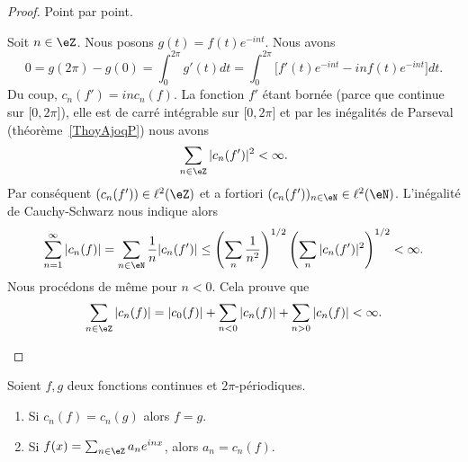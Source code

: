 \begin{proof}
	Point par point.
	\begin{subproof}
		Soit \( n\in \eZ\). Nous posons \( g(t)=f(t) e^{-int}\). Nous avons
		\begin{equation}
			0=g(2\pi)-g(0)=\int_0^{2\pi}g'(t)dt=\int_0^{2\pi}\big[ f'(t) e^{-int}-inf(t) e^{-int} \big]dt.
		\end{equation}
		Du coup, \( c_n(f')=inc_n(f)\). La fonction \( f'\) étant bornée (parce que continue sur \( \mathopen[ 0 , 2\pi \mathclose]\)), elle est de carré intégrable sur \( \mathopen[ 0 , 2\pi \mathclose]\) et par les inégalités de Parseval (théorème~\ref{ThoyAjoqP}) nous avons
		\begin{equation}
			\sum_{n\in \eZ}| c_n(f') |^2<\infty.
		\end{equation}
		Par conséquent \( (c_n(f'))\in \ell^2(\eZ)\) et a fortiori \( (c_n(f'))_{n\in \eN}\in \ell^2(\eN)\). L'inégalité de Cauchy-Schwarz nous indique alors
		\begin{equation}
			\sum_{n=1}^{\infty}| c_n(f) |=\sum_{n\in \eN}\frac{1}{ n }| c_n(f') |\leq \left( \sum_n\frac{1}{ n^2 } \right)^{1/2}\left( \sum_{n}| c_n(f') |^2 \right)^{1/2}<\infty.
		\end{equation}
		Nous procédons de même pour \( n<0\). Cela prouve que
		\begin{equation}
			\sum_{n\in \eZ}| c_n(f) | = |c_0(f)|+\sum_{n<0}| c_n(f) |+\sum_{n>0} | c_n(f) |  <\infty.
		\end{equation}
	\end{subproof}
\end{proof}

\begin{corollary}   \label{CordgtXlC}
	Soient \( f,g\) deux fonctions continues et \( 2\pi\)-périodiques.
	\begin{enumerate}
		\item       \label{ITEMooPLTIooSDykYF}
		      Si \( c_n(f)=c_n(g)\) alors \( f=g\).
		\item       \label{ITEMooQMMSooEpIFbt}
		      Si \( f(x)=\sum_{n\in \eZ}a_n e^{inx}\), alors \( a_n=c_n(f)\).
	\end{enumerate}
\end{corollary}

